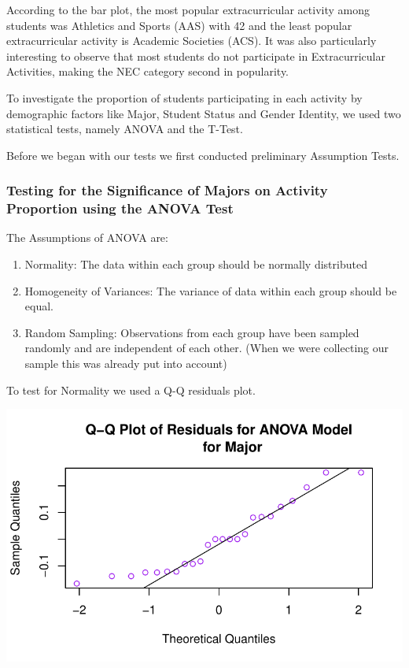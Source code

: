 \documentclass[
  letterpaper,
  DIV=11,
  numbers=noendperiod]{scrartcl}
\providecommand{\tightlist}{%
  \setlength{\itemsep}{0pt}\setlength{\parskip}{0pt}}\usepackage{longtable,booktabs,array}
\begin{document}
According to the bar plot, the most popular extracurricular activity
among students was Athletics and Sports (AAS) with 42 and the least
popular extracurricular activity is Academic Societies (ACS). It was
also particularly interesting to observe that most students do not
participate in Extracurricular Activities, making the NEC category
second in popularity.

To investigate the proportion of students participating in each activity
by demographic factors like Major, Student Status and Gender Identity,
we used two statistical tests, namely ANOVA and the T-Test.

Before we began with our tests we first conducted preliminary Assumption
Tests.

\subsubsection{Testing for the Significance of Majors on Activity
Proportion using the ANOVA
Test}\label{testing-for-the-significance-of-majors-on-activity-proportion-using-the-anova-test}

The Assumptions of ANOVA are:

\begin{enumerate}
\def\labelenumi{\arabic{enumi}.}
\tightlist
\item
  Normality: The data within each group should be normally distributed
\item
  Homogeneity of Variances: The variance of data within each group
  should be equal.
\item
  Random Sampling: Observations from each group have been sampled
  randomly and are independent of each other. (When we were collecting
  our sample this was already put into account)
\end{enumerate}

To test for Normality we used a Q-Q residuals plot.

\includegraphics{technical_report_files/figure-pdf/r2-1.pdf}
\end{document}
